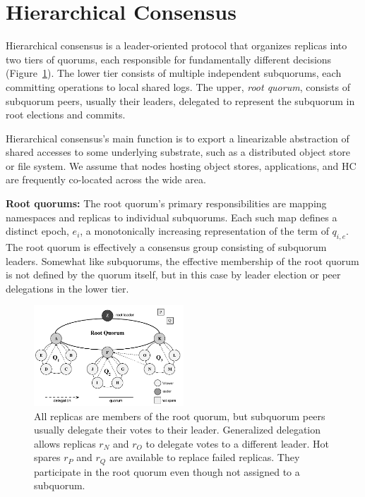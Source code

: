 \documentclass[letterpaper,10pt,twocolumn]{article}
\newcommand{\sub}{subquorum\xspace}
\newcommand{\subs}{subquorums\xspace}
\newcommand{\roo}{root quorum\xspace}
\newcommand{\para}[1]{\vspace{.04in}\noindent\textbf{#1}}
\begin{document}
\section{Hierarchical Consensus}
\label{sec:protocol}


Hierarchical consensus is a leader-oriented protocol that organizes replicas into
two tiers of quorums, each responsible for fundamentally different decisions (Figure~\ref{fig:tiers}).
The lower tier consists of multiple independent \subs, each committing
operations to local shared logs.
The upper,  \emph{\roo}, consists of \sub peers, usually their leaders,
delegated to represent the \sub in root elections and commits.

Hierarchical consensus's main function is to export a linearizable abstraction of shared
accesses to some underlying substrate, such as a distributed object store or file system.
We assume that nodes hosting object stores, applications, and HC are frequently co-located
across the wide area.


\para{Root quorums:}
The \roo's primary
responsibilities are mapping namespaces and replicas to individual \subs.
Each such map defines a distinct epoch, $e_i$, a
monotonically increasing representation of the term of $q_{i,e}$.
The \roo is effectively a consensus group consisting of \sub leaders.
Somewhat like \subs, the effective membership of the \roo is not defined by the
quorum itself, but in this case by leader election or peer delegations in the lower tier.

\begin{figure}[t]
    \centering
    \includegraphics[width=0.5\textwidth]{figures/election3}
    \caption{All replicas are members of the \roo, but \sub peers usually delegate their votes
      to their leader. Generalized delegation allows replicas $r_N$ and $r_O$ to
      delegate votes to a different leader. Hot spares $r_P$ and $r_Q$
      are available to replace failed replicas. They participate in the \roo
      even though not assigned to a \sub.}
    \label{fig:tiers}
\end{figure}
\end{document}
